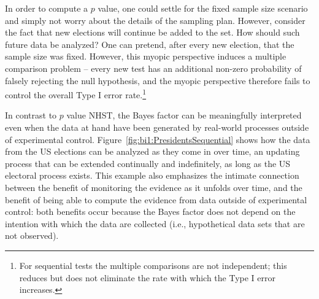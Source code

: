 In order to compute a $p$ value, one could settle for the fixed sample size scenario and simply not worry about the details of the sampling plan. However, consider the fact that new elections will continue be added to the set. How should such future data be analyzed? One can pretend, after every new election, that the sample size was fixed. However, this myopic perspective induces a multiple comparison problem -- every new test has an additional non-zero probability of falsely rejecting the null hypothesis, and the myopic perspective therefore fails to control the overall Type I error rate.\footnote{For sequential tests the multiple comparisons are not independent; this reduces but does not eliminate the rate with which the Type I error increases.}

In contrast to $p$ value NHST, the Bayes factor can be meaningfully interpreted even when the data at hand have been generated by real-world processes outside of experimental control. Figure~\ref{fig:bi1:PresidentsSequential} shows how the data from the US elections can be analyzed as they come in over time, an updating process that can be extended continually and indefinitely, as long as the US electoral process exists. This example also emphasizes the intimate connection between the benefit of monitoring the evidence as it unfolds over time, and the benefit of being able to compute the evidence from data outside of experimental control: both benefits occur because the Bayes factor does not depend on the intention with which the data are collected (i.e., hypothetical data sets that are not observed).

